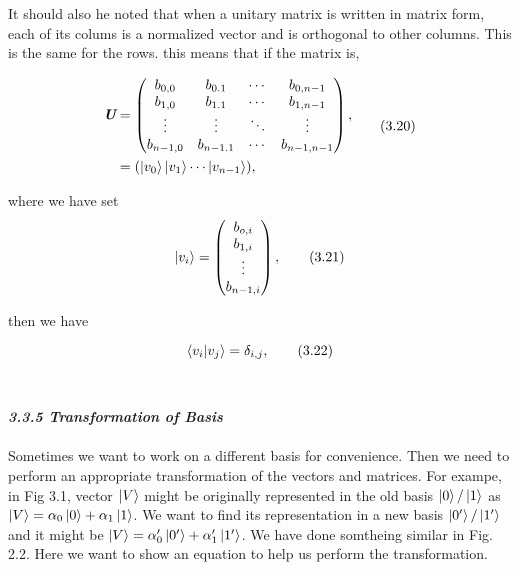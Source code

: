 \documentclass{article}
\begin{document}
It should also he noted that when a unitary matrix is written in matrix form, each
of its colums is a normalized vector and is orthogonal to other columns. This is
the same for the rows. this means that if the matrix is,

\begin{align} \label{eq 3.20}
    \begin{split}
        \textit{\textbf{U}}&=\begin{pmatrix}
            b_{0,0} & b_{0.1} & \cdots & b_{0,n-1}\\
            b_{1,0} & b_{1.1} & \cdots & b_{1,n-1}\\
            \vdots & \vdots & \ddots & \vdots\\
            b_{n-1,0} & b_{n-1.1} & \cdots & b_{n-1,n-1}\\
        \end{pmatrix},\\
        &=(\ket{v_0}\ket{v_1}\cdots\ket{v_{n-1}}),
    \end{split} \tag{3.20}
\end{align}

where we have set
\begin{equation} \label{eq 3.21}
    \ket{v_i}=\begin{pmatrix}
        b_{o,i}\\
        b_{1,i}\\
        \vdots\\
        b_{n-1,i}\\
    \end{pmatrix}, \tag{3.21}
\end{equation} 

then we have 

\begin{equation} \label{eq 3.22}
    \braket{v_i|v_j}=\delta_{i,j}, \tag{3.22}
\end{equation}\\ \\
\textit{\textbf{\large 3.3.5 Transformation of Basis}}
\\\\
Sometimes we want to work on a different basis for convenience. Then 
we need to perform an appropriate transformation of the vectors and matrices.
For exampe, in Fig 3.1, vector $\ket{V}$ might be originally represented in the old
basis $\ket{0}/\ket{1}$ as $\ket{V}=\alpha_0\ket{0}+\alpha_1\ket{1}$.
We want to find its representation in a new basis $\ket{0^\prime}/\ket{1^\prime}$
and it might be $\ket{V}=\alpha^\prime_0\ket{0^\prime}+\alpha^\prime_1\ket{1^\prime}$.
We have done somtheing similar in Fig. 2.2. Here we want to show an equation to help us
perform the transformation.
\end{document}
